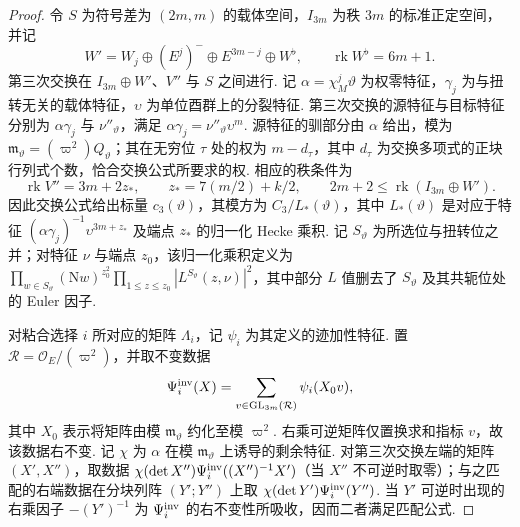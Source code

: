 \begin{proof}
令 $S$ 为符号差为 $(2m,m)$ 的载体空间，$I_{3m}$ 为秩 $3m$ 的标准正定空间，并记
\[
 W'=W_j\oplus(E^j)^-\oplus E^{3m-j}\oplus W^\flat ,
 \qquad \operatorname{rk}W^\flat=6m+1 .
\]
第三次交换在 $I_{3m}\oplus W'$、$V''$ 与 $S$ 之间进行. 记 $\alpha=\chi_M^j\vartheta$ 为权零特征，$\gamma_j$ 为与扭转无关的载体特征，$\upsilon$ 为单位酉群上的分裂特征. 第三次交换的源特征与目标特征分别为 $\alpha\gamma_j$ 与 $\nu''_\vartheta$，满足 $\alpha\gamma_j=\nu''_\vartheta\upsilon^m$. 源特征的驯部分由 $\alpha$ 给出，模为 $\mathfrak m_\vartheta=(\varpi^2)Q_\vartheta$；其在无穷位 $\tau$ 处的权为 $m-d_\tau$，其中 $d_\tau$ 为交换多项式的正块行列式个数，恰合交换公式所要求的权. 相应的秩条件为
\[
 \operatorname{rk}V''=3m+2z_*,
 \qquad z_*=7(m/2)+k/2,
 \qquad 2m+2\le\operatorname{rk}(I_{3m}\oplus W').
\]
因此交换公式给出标量 $c_3(\vartheta)$，其模方为 $C_3/L_*(\vartheta)$，其中 $L_*(\vartheta)$ 是对应于特征 $(\alpha\gamma_j)^{-1}\upsilon^{3m+z_*}$ 及端点 $z_*$ 的归一化 Hecke 乘积. 记 $S_\vartheta$ 为所选位与扭转位之并；对特征 $\nu$ 与端点 $z_0$，该归一化乘积定义为 $\prod_{w\in S_\vartheta}(\mathrm Nw)^{z_0^2}\prod_{1\le z\le z_0}|L^{S_\vartheta}(z,\nu)|^2$，其中部分 $L$ 值删去了 $S_\vartheta$ 及其共轭位处的 Euler 因子.

对粘合选择 $i$ 所对应的矩阵 $\Lambda_i$，记 $\psi_i$ 为其定义的迹加性特征. 置 $\mathcal R=\mathcal O_E/(\varpi^2)$，并取不变数据
\[
 \Psi_i^{\rm inv}(X)
   =\sum_{v\in\mathrm{GL}_{3m}(\mathcal R)}
       \psi_i(X_0v) ,
\]
其中 $X_0$ 表示将矩阵由模 $\mathfrak m_\vartheta$ 约化至模 $\varpi^2$. 右乘可逆矩阵仅置换求和指标 $v$，故该数据右不变. 记 $\chi$ 为 $\alpha$ 在模 $\mathfrak m_\vartheta$ 上诱导的剩余特征. 对第三次交换左端的矩阵 $(X',X'')$，取数据 $\chi(\det X'')\Psi_i^{\rm inv}((X'')^{-1}X')$（当 $X''$ 不可逆时取零）；与之匹配的右端数据在分块列阵 $(Y';Y'')$ 上取 $\chi(\det Y')\Psi_i^{\rm inv}(Y'')$. 当 $Y'$ 可逆时出现的右乘因子 $-(Y')^{-1}$ 为 $\Psi_i^{\rm inv}$ 的右不变性所吸收，因而二者满足匹配公式.


\end{proof}
